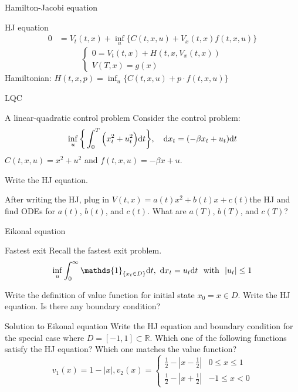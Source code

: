 \documentclass[color=usenames,dvipsnames]{beamer}
\newcommand{\dt}{\text{\normalfont d}t}
\newcommand{\dx}{\text{\normalfont d}x}
\begin{document}
\begin{frame}{Hamilton-Jacobi equation}
    \begin{block}
        {HJ equation}
\[
\begin{split}
    0 & = V_t(t,x) +\inf_{u}\Big\{C(t,x,u) + V_x(t,x)  f(t,x,u) \Big\}
\end{split}
\]
\[
\begin{cases}
    0  = V_t(t,x) + H(t,x,V_x(t,x))\\
    V(T,x)=g(x)
\end{cases}
\]
Hamiltonian: 
$H(t,x,p)= \inf_{u}\Big\{C(t,x,u) + p\cdot   f(t,x,u) \Big\}$
    \end{block}
\end{frame}
\begin{frame}{LQC}
    \begin{block}
        {A linear-quadratic control problem}
        Consider the control problem:
\begin{equation}
\inf_{u}\bigg\{\int_0^T\Big(x_t^2 +u_t^2\Big) {{\dt}}\bigg\},~~~{\dx}_t = (-\beta x_t + u_t ){{\dt}}
\end{equation}
$C(t,x,u)=x^2 + u^2$ and $f(t,x,u)=-\beta x + u$.

Write the HJ  equation. 

After writing the HJ, plug in $V(t,x)=a(t)x^2+b(t)x+c(t)$the HJ and find ODEs for $a(t)$, $b(t)$, and $c(t)$. What are $a(T)$, $b(T)$, and $c(T)$?
    \end{block}
\end{frame}



\begin{frame}{Eikonal equation}
    \begin{block}
        {Fastest exit}
        Recall the fastest exit problem.
        \[
        \inf_u\int_0^\infty \mathds{1}_{\{x_t\in D\}}{\dt},~{\dx}_t=u_t{{\dt}}~\text{ with }~|u_t|\le1
        \]
        
        Write the definition of value function for initial state $x_0=x\in D$. Write the HJ equation. 
        Is there any boundary condition?
    \end{block}

    \begin{block}
        {Solution to Eikonal equation}
        Write the HJ equation and boundary condition for the special case where $D=[-1,1]\subset\mathbb{R}$. Which one of the following functions satisfy the HJ equation? Which one matches the value function?
        \[
        v_1(x) = 1-|x|, v_2(x)= \begin{cases}
            \frac12-|x-\frac12|&0\le x\le1\\
            \frac12-|x+\frac12|&-1\le x<0
        \end{cases}
        \]
    \end{block}
\end{frame}
\end{document}
